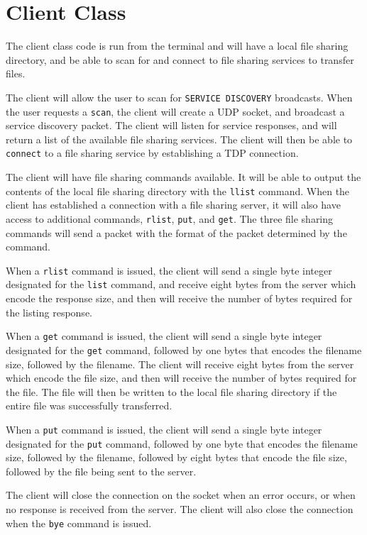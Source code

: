 \section*{Client Class}
The client class code is run from the terminal and will have a local file sharing directory, and be able to scan for and connect to file sharing services to transfer files.

The client will allow the user to scan for \texttt{SERVICE DISCOVERY} broadcasts. When the user requests a \texttt{scan}, the client will create a UDP socket, and broadcast a service discovery packet. The client will listen for service responses, and will return a list of the available file sharing services. The client will then be able to \texttt{connect} to a file sharing service by establishing a TDP connection.

The client will have file sharing commands available. It will be able to output the contents of the local file sharing directory with the \texttt{llist} command. When the client has established a connection with a file sharing server, it will also have access to additional commands, \texttt{rlist}, \texttt{put}, and \texttt{get}. The three file sharing commands will send a packet with the format of the packet determined by the command.

When a \texttt{rlist} command is issued, the client will send a single byte integer designated for the \texttt{list} command, and receive eight bytes from the server which encode the response size, and then will receive the number of bytes required for the listing response.

When a \texttt{get} command is issued, the client will send a single byte integer designated for the \texttt{get} command, followed by one bytes that encodes the filename size, followed by the filename. The client will receive eight bytes from the server which encode the file size, and then will receive the number of bytes required for the file. The file will then be written to the local file sharing directory if the entire file was successfully transferred.

When a \texttt{put} command is issued, the client will send a single byte integer designated for the \texttt{put} command, followed by one byte that encodes the filename size, followed by the filename, followed by eight bytes that encode the file size, followed by the file being sent to the server.

The client will close the connection on the socket when an error occurs, or when no response is received from the server. The client will also close the connection when the \texttt{bye} command is issued.
